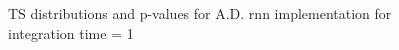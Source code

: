 \begin{figure}
    \centering
{}
    
    \caption{TS distributions and p-values for A.D. rnn implementation for integration time = 1}
    \label{fig:ts-distribution-and-p-values-rnn-it-1}
\end{figure}

